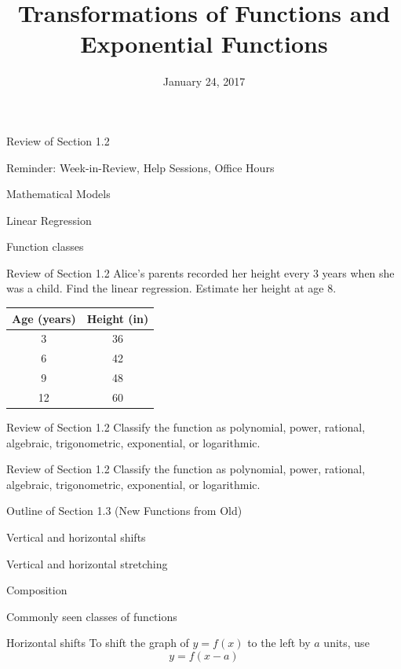 \documentclass[t,handout]{beamer}
\title{Transformations of Functions and \\
Exponential Functions}
\date{January 24, 2017}
\newenvironment{fpi}
  {\itemize[nolistsep,itemsep=\fill]}
  {\vfill\enditemize}
\begin{document}
\frame{\titlepage}


\begin{frame}{Review of Section 1.2}
\begin{fpi}
\item Reminder: Week-in-Review, Help Sessions, Office Hours
\item Mathematical Models
\item Linear Regression
\item Function classes
\end{fpi}
\end{frame}

\begin{frame}{Review of Section 1.2}
Alice's parents recorded her height every 3 years when she was a child.
Find the linear regression.  Estimate her height at age 8.
\begin{table}
\begin{tabular}{c c}
Age (years) & Height (in) \\
\hline
3 & 36 \\
6 & 42 \\
9  & 48 \\
12 & 60
\end{tabular}
\end{table}

\end{frame}

\begin{frame}{Review of Section 1.2}
Classify the function as polynomial, power, rational, algebraic, trigonometric, exponential, or logarithmic.
\end{frame}

\begin{frame}{Review of Section 1.2}
Classify the function as polynomial, power, rational, algebraic, trigonometric, exponential, or logarithmic.
\end{frame}

\begin{frame}{Outline of Section 1.3 (New Functions from Old)}
\begin{fpi}
\item Vertical and horizontal shifts
\item Vertical and horizontal stretching
\item Composition
\item Commonly seen classes of functions
\end{fpi}
\end{frame}

\begin{frame}{Horizontal shifts}
To shift the graph of $y = f(x)$ to the left by $a$ units, use
$$y = f(x - a)$$
\end{frame}
\end{document}
